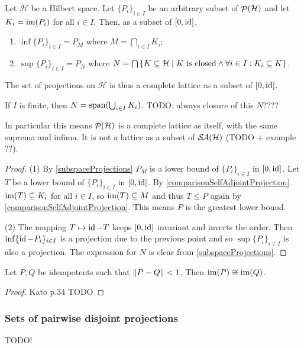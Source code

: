\begin{proposition}
Let $\mathcal{H}$ be a Hilbert space. Let $\{P_i\}_{i\in I}$ be an arbitrary subset of $\mathop{\mathcal{P}}\nolimits(\mathcal{H})$ and let $K_i = \operatorname{im}(P_i)$ for all $i\in I$. Then, as a subset of $[0,\operatorname{id}]$,
\begin{enumerate}
\item $\inf \{P_i\}_{i\in I} = P_M$ where $M = \bigcap_{i\in I}K_i$;
\item $\sup \{P_i\}_{i\in I} = P_N$ where $N = \bigcap\setbuilder{K \subseteq \mathcal{H}}{\text{$K$ is closed} \land \forall i\in I: K_i \subseteq K}$.
\end{enumerate}
The set of projections on $\mathcal{H}$ is thus a complete lattice as a subset of $[0,\operatorname{id}]$.

If $I$ is finite, then $N = \operatorname{span}(\bigcup_{i\in I}K_i)$. TODO: always closure of this $N$????
\end{proposition}
In particular this means $\mathop{\mathcal{P}}\nolimits(\mathcal{H})$ is a complete lattice as itself, with the same suprema and infima. It is not a lattice as a subset of $\mathop{\mathcal{S}\hspace{-0.15em}\mathcal{A}}\nolimits(\mathcal{H})$ (TODO + example ??).
\begin{proof}
(1) By \ref{subspaceProjections} $P_M$ is a lower bound of $\{P_i\}_{i\in I}$ in $[0,\operatorname{id}]$. Let $T$ be a lower bound of $\{P_i\}_{i\in I}$ in $[0,\operatorname{id}]$. By \ref{comparisonSelfAdjointProjection} $\operatorname{im}(T)\subseteq K_i$ for all $i\in I$, so $\operatorname{im}(T)\subseteq M$ and thus $T\leq P$ again by \ref{comparisonSelfAdjointProjection}. This means $P$ is the greatest lower bound.

(2) The mapping $T\mapsto \operatorname{id}-T$ keeps $[0,\operatorname{id}]$ invariant and inverts the order. Then $\inf \{\operatorname{id} - P_i\}_{i\in I}$ is a projection due to the previous point and so $\sup \{P_i\}_{i\in I}$ is also a projection. The expression for $N$ is clear from \ref{subspaceProjections}.
\end{proof}

\begin{proposition}
Let $P,Q$ be idempotents such that $\lVert P-Q\rVert<1$. Then $\operatorname{im}(P) \cong \operatorname{im}(Q)$.
\end{proposition}
\begin{proof}
Kato p.34 TODO
\end{proof}

\subsubsection{Sets of pairwise disjoint projections}
TODO!

